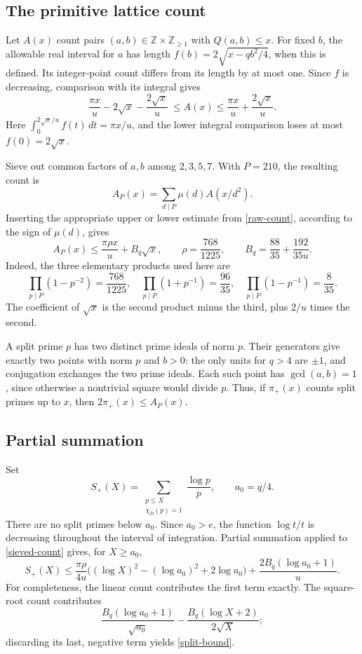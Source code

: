 \documentclass[11pt]{article}
\newcommand{\Z}{\mathbb Z}
\begin{document}
\subsection{The primitive lattice count}

Let \(A(x)\) count pairs \((a,b)\in\Z\times\Z_{\ge1}\) with
\(Q(a,b)\le x\). For fixed \(b\), the allowable real interval for \(a\)
has length
\(f(b)=2\sqrt{x-qb^2/4}\), when this is defined. Its integer-point
count differs from its length by at most one. Since \(f\) is decreasing,
comparison with its integral gives
\begin{equation}\label{raw-count}
 \frac{\pi x}{u}-2\sqrt x-\frac{2\sqrt x}{u}
 \ \le A(x)\le\frac{\pi x}{u}+\frac{2\sqrt x}{u}.
\end{equation}
Here \(\int_0^{2\sqrt x/u}f(t)\,dt=\pi x/u\), and the lower
integral comparison loses at most \(f(0)=2\sqrt x\).

Sieve out common factors of \(a,b\) among \(2,3,5,7\). With \(P=210\),
the resulting count is
\[
 A_P(x)=\sum_{d\mid P}\mu(d)A(x/d^2).
\]
Inserting the appropriate upper or lower estimate from
\eqref{raw-count}, according to the sign of \(\mu(d)\), gives
\begin{equation}\label{sieved-count}
 A_P(x)\le\frac{\pi\rho x}{u}+B_q\sqrt x,
 \qquad
 \rho=\frac{768}{1225},\qquad
 B_q=\frac{88}{35}+\frac{192}{35u}.
\end{equation}
Indeed, the three elementary products used here are
\[
 \prod_{p\mid P}(1-p^{-2})=\frac{768}{1225},\quad
 \prod_{p\mid P}(1+p^{-1})=\frac{96}{35},\quad
 \prod_{p\mid P}(1-p^{-1})=\frac{8}{35}.
\]
The coefficient of \(\sqrt x\) is the second product minus the third,
plus \(2/u\) times the second.

A split prime \(p\) has two distinct prime ideals of norm \(p\).
Their generators give exactly two points with norm \(p\) and \(b>0\):
the only units for \(q>4\) are \(\pm1\), and conjugation exchanges the
two prime ideals. Each such point has \(\gcd(a,b)=1\), since otherwise
a nontrivial square would divide \(p\). Thus, if \(\pi_+(x)\) counts
split primes up to \(x\), then \(2\pi_+(x)\le A_P(x)\).

\subsection{Partial summation}

Set
\[
 S_+(X)=\sum_{\substack{p\le X\\\chi_D(p)=1}}\frac{\log p}{p},
 \qquad a_0=q/4.
\]
There are no split primes below \(a_0\). Since \(a_0>e\), the function
\(\log t/t\) is decreasing throughout the interval of integration.
Partial summation applied to \eqref{sieved-count} gives, for \(X\ge a_0\),
\begin{equation}\label{split-bound}
 S_+(X)\le
 \frac{\pi\rho}{4u}
 \bigl((\log X)^2-(\log a_0)^2+2\log a_0\bigr)
 +\frac{2B_q(\log a_0+1)}{u}.
\end{equation}
For completeness, the linear count contributes the first term exactly.
The square-root count contributes
\[
 \frac{B_q(\log a_0+1)}{\sqrt{a_0}}
 -\frac{B_q(\log X+2)}{2\sqrt X};
\]
discarding its last, negative term yields \eqref{split-bound}.
\end{document}

